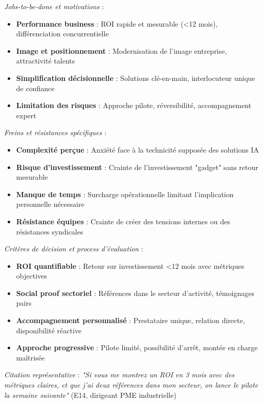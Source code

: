 \emph{Jobs-to-be-done et motivations} \cite{christensen2016competing} :
\begin{itemize}
    \item \textbf{Performance business} : ROI rapide et mesurable (<12 mois), différenciation concurrentielle
    \item \textbf{Image et positionnement} : Modernisation de l'image entreprise, attractivité talents
    \item \textbf{Simplification décisionnelle} : Solutions clé-en-main, interlocuteur unique de confiance
    \item \textbf{Limitation des risques} : Approche pilote, réversibilité, accompagnement expert
\end{itemize}

\emph{Freins et résistances spécifiques} :
\begin{itemize}
    \item \textbf{Complexité perçue} : Anxiété face à la technicité supposée des solutions IA
    \item \textbf{Risque d'investissement} : Crainte de l'investissement "gadget" sans retour mesurable
    \item \textbf{Manque de temps} : Surcharge opérationnelle limitant l'implication personnelle nécessaire
    \item \textbf{Résistance équipes} : Crainte de créer des tensions internes ou des résistances syndicales
\end{itemize}

\emph{Critères de décision et process d'évaluation} :
\begin{itemize}
    \item \textbf{ROI quantifiable} : Retour sur investissement <12 mois avec métriques objectives
    \item \textbf{Social proof sectoriel} : Références dans le secteur d'activité, témoignages pairs
    \item \textbf{Accompagnement personnalisé} : Prestataire unique, relation directe, disponibilité réactive
    \item \textbf{Approche progressive} : Pilote limité, possibilité d'arrêt, montée en charge maîtrisée
\end{itemize}

\emph{Citation représentative} : \emph{"Si vous me montrez un ROI en 3 mois avec des métriques claires, et que j'ai deux références dans mon secteur, on lance le pilote la semaine suivante"} (E14, dirigeant PME industrielle)

